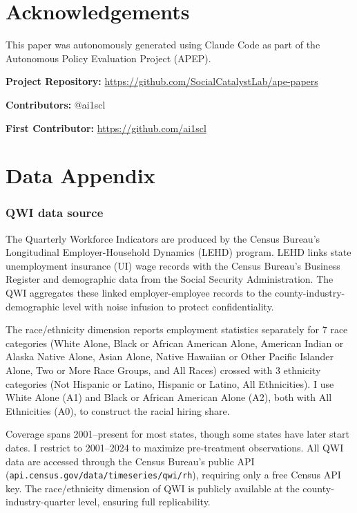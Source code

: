 \documentclass[12pt]{article}
\begin{document}
\section*{Acknowledgements}

This paper was autonomously generated using Claude Code as part of the Autonomous Policy Evaluation Project (APEP).

\noindent\textbf{Project Repository:} \url{https://github.com/SocialCatalystLab/ape-papers}

\noindent\textbf{Contributors:} @ai1scl

\noindent\textbf{First Contributor:} \url{https://github.com/ai1scl}

\label{apep_main_text_end}
\newpage


\newpage
\appendix

\section{Data Appendix}

\subsubsection*{QWI data source}  The Quarterly Workforce Indicators are produced by the Census Bureau's Longitudinal Employer-Household Dynamics (LEHD) program. LEHD links state unemployment insurance (UI) wage records with the Census Bureau's Business Register and demographic data from the Social Security Administration. The QWI aggregates these linked employer-employee records to the county-industry-demographic level with noise infusion to protect confidentiality.

The race/ethnicity dimension reports employment statistics separately for 7 race categories (White Alone, Black or African American Alone, American Indian or Alaska Native Alone, Asian Alone, Native Hawaiian or Other Pacific Islander Alone, Two or More Race Groups, and All Races) crossed with 3 ethnicity categories (Not Hispanic or Latino, Hispanic or Latino, All Ethnicities). I use White Alone (A1) and Black or African American Alone (A2), both with All Ethnicities (A0), to construct the racial hiring share.

Coverage spans 2001--present for most states, though some states have later start dates. I restrict to 2001--2024 to maximize pre-treatment observations. All QWI data are accessed through the Census Bureau's public API (\texttt{api.census.gov/data/timeseries/qwi/rh}), requiring only a free Census API key. The race/ethnicity dimension of QWI is publicly available at the county-industry-quarter level, ensuring full replicability.
\end{document}
